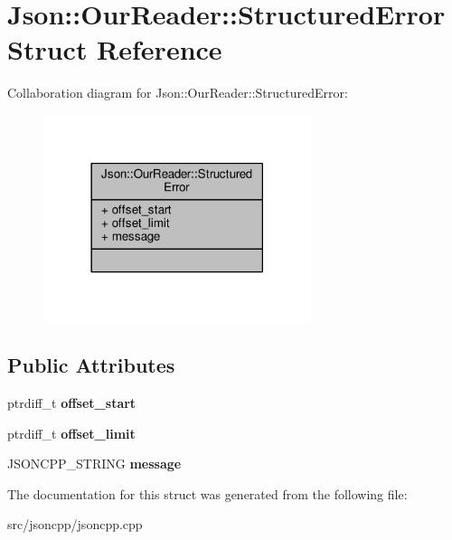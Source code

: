 \hypertarget{structJson_1_1OurReader_1_1StructuredError}{}\section{Json\+:\+:Our\+Reader\+:\+:Structured\+Error Struct Reference}
\label{structJson_1_1OurReader_1_1StructuredError}


Collaboration diagram for Json\+:\+:Our\+Reader\+:\+:Structured\+Error\+:
\nopagebreak
\begin{figure}[H]
\begin{center}
\leavevmode
\includegraphics[width=222pt]{d4/d19/structJson_1_1OurReader_1_1StructuredError__coll__graph}
\end{center}
\end{figure}
\subsection*{Public Attributes}
\begin{DoxyCompactItemize}
\item 
ptrdiff\+\_\+t {\bfseries offset\+\_\+start}\hypertarget{structJson_1_1OurReader_1_1StructuredError_a102677698afb8177c985e72dafe72b15}{}\label{structJson_1_1OurReader_1_1StructuredError_a102677698afb8177c985e72dafe72b15}

\item 
ptrdiff\+\_\+t {\bfseries offset\+\_\+limit}\hypertarget{structJson_1_1OurReader_1_1StructuredError_a15491a751a39c5153af04e68b1d0abb9}{}\label{structJson_1_1OurReader_1_1StructuredError_a15491a751a39c5153af04e68b1d0abb9}

\item 
J\+S\+O\+N\+C\+P\+P\+\_\+\+S\+T\+R\+I\+NG {\bfseries message}\hypertarget{structJson_1_1OurReader_1_1StructuredError_a9d0b9986bf765d067dfcf2f971a450d1}{}\label{structJson_1_1OurReader_1_1StructuredError_a9d0b9986bf765d067dfcf2f971a450d1}

\end{DoxyCompactItemize}


The documentation for this struct was generated from the following file\+:\begin{DoxyCompactItemize}
\item 
src/jsoncpp/jsoncpp.\+cpp\end{DoxyCompactItemize}
